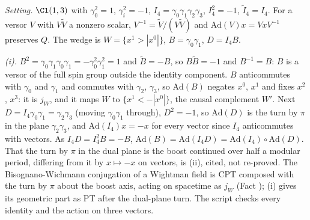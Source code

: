 \emph{Setting.} $\Cl(1,3)$ with $\gamma_{0}^{2} = 1$, $\gamma_{i}^{2} = -1$, $I_{4} = \gamma_{0}\gamma_{1}\gamma_{2}\gamma_{3}$, $I_{4}^{2} = -1$, $\tilde I_{4} = I_{4}$. For a versor $V$ with $V\tilde V$ a nonzero scalar, $V^{-1} = \tilde V/(V\tilde V)$ and $\mathrm{Ad}(V)x = VxV^{-1}$ preserves $Q$. The wedge is $W = \{x^{1} > |x^{0}|\}$, $B = \gamma_{0}\gamma_{1}$, $D = I_{4}B$.

\emph{(i).} $B^{2} = \gamma_{0}\gamma_{1}\gamma_{0}\gamma_{1} = -\gamma_{0}^{2}\gamma_{1}^{2} = 1$ and $\tilde B = -B$, so $B\tilde B = -1$ and $B^{-1} = B$: $B$ is a versor of the full spin group outside the identity component. $B$ anticommutes with $\gamma_{0}$ and $\gamma_{1}$ and commutes with $\gamma_{2}$, $\gamma_{3}$, so $\mathrm{Ad}(B)$ negates $x^{0}$, $x^{1}$ and fixes $x^{2}$, $x^{3}$: it is $j_{W}$, and it maps $W$ to $\{x^{1} < -|x^{0}|\}$, the causal complement $W'$. Next $D = I_{4}\gamma_{0}\gamma_{1} = \gamma_{2}\gamma_{3}$ (moving $\gamma_{0}\gamma_{1}$ through), $D^{2} = -1$, so $\mathrm{Ad}(D)$ is the turn by $\pi$ in the plane $\gamma_{2}\gamma_{3}$, and $\mathrm{Ad}(I_{4})x = -x$ for every vector since $I_{4}$ anticommutes with vectors. As $I_{4}D = I_{4}^{2}B = -B$, $\mathrm{Ad}(B) = \mathrm{Ad}(I_{4}D) = \mathrm{Ad}(I_{4}) \circ \mathrm{Ad}(D)$. That the turn by $\pi$ in the dual plane is the boost continued over half a modular period, differing from it by $x \mapsto -x$ on vectors, is (ii), cited, not re-proved. The Bisognano-Wichmann conjugation of a Wightman field is CPT composed with the turn by $\pi$ about the boost axis, acting on spacetime as $j_{W}$ (Fact ); (i) gives its geometric part as PT after the dual-plane turn. The script checks every identity and the action on three vectors.

